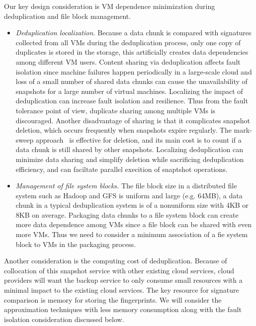 Our key design consideration is VM dependence minimization during deduplication and file block management.
\begin{itemize}
\item {\em Deduplication localization.}
Because a data chunk is compared with signatures collected from all VMs during
the deduplication process, only one copy of duplicates is stored in the storage,
this artificially creates data dependencies among different VM users. 
Content sharing via deduplication affects fault isolation since machine failures happen periodically 
in a large-scale cloud and
loss of a small number of shared data chunks can 
cause the unavailability of snapshots for a large number of virtual machines.
Localizing the impact of deduplication can increase fault isolation and resilience.
Thus from the fault tolerance point of view,  duplicate sharing among multiple VMs is 
discouraged. 
Another disadvantage of sharing is that it complicates snapshot deletion, 
which  occurs frequently when snapshots expire regularly. 
The mark-sweep approach~\cite{Guo2011} is effective for deletion, and its main cost
is to count if a data chunk is still shared by other snapshots.
Localizing deduplication can  minimize data sharing and simplify deletion while sacrificing 
deduplication efficiency, and  can faciltate parallel execition of snaptshot operations.
\item{\em  Management of file system blocks.}
The file block size in a distributed file system such as  Hadoop and GFS is uniform and large (e.g.  64MB),
 a data chunk in a typical deduplication system is of a nonuniform size with 4KB or 8KB on average.
Packaging data chunks to a file system block can create more data dependence among VMs
since a file block can be shared with even more VMs.
Thus we need to consider a minimum association of a fie system block to VMs in the packaging process.
\end{itemize}

Another consideration is the computing cost of deduplication.
Because of collocation of this snapshot service with other existing cloud services, 
cloud providers will want the backup service to only consume small resources
with a minimal impact to the existing cloud services.
The key resource for signature comparison  is memory for storing the fingerprints. 
We will consider the approximation techniques with less memory consumption along 
with the fault isolation consideration discussed below. 

